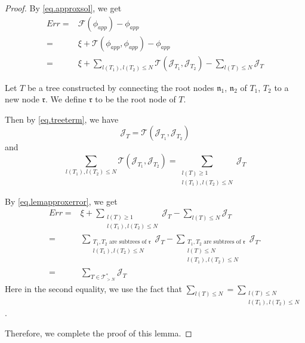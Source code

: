 \begin{proof} By \eqref{eq.approxsol}, we get
\begin{equation}\label{eq.lemapproxerror}
\begin{split}
    Err=&\mathcal{F}(\phi_{app})-\phi_{app}    
    \\
    =&\xi+\mathcal{T}(\phi_{app},\phi_{app})-\phi_{app}
    \\
    =&\xi+\sum_{l(T_1),l(T_2)\le N} \mathcal{T}(\mathcal{J}_{T_1},\mathcal{J}_{T_2})-\sum_{l(T)\le N} \mathcal{J}_T
\end{split}
\end{equation}

Let $T$ be a tree constructed by connecting the root nodes $\mathfrak{n}_1$, $\mathfrak{n}_2$ of $T_1$, $T_2$ to a new node $\mathfrak{r}$. We define $\mathfrak{r}$ to be the root node of $T$.

Then by \eqref{eq.treeterm}, we have
\begin{equation}
    \mathcal{J}_T=\mathcal{T}(\mathcal{J}_{T_1}, \mathcal{J}_{T_2})
\end{equation}
and 
\begin{equation}
    \sum_{l(T_1),l(T_2)\le N} \mathcal{T}(\mathcal{J}_{T_1},\mathcal{J}_{T_2})=\sum_{\substack{l(T)\ge 1\\ l(T_1),l(T_2)\le N}} \mathcal{J}_{T}
\end{equation}

By \eqref{eq.lemapproxerror}, we get
\begin{equation}
\begin{split}
    Err=&\xi+\sum_{\substack{l(T)\ge 1\\ l(T_1),l(T_2)\le N}} \mathcal{J}_{T}-\sum_{l(T)\le N} \mathcal{J}_T
    \\
    =&\sum_{\substack{T_1,T_2\text{ are subtrees of }\mathfrak{r}\\ l(T_1),l(T_2)\le N}} \mathcal{J}_{T}-\sum_{\substack{T_1,T_2\text{ are subtrees of }\mathfrak{r}\\l(T)\le N\\ l(T_1),l(T_2)\le N}} \mathcal{J}_T.
    \\
    =&\sum_{T\in \mathcal{T}_{>N}^*} \mathcal{J}_T
\end{split}
\end{equation}
Here in the second equality, we use the fact that $\sum_{l(T)\le N}=\sum_{\substack{l(T)\le N\\ l(T_1),l(T_2)\le N}}$.

Therefore, we complete the proof of this lemma.
\end{proof}

